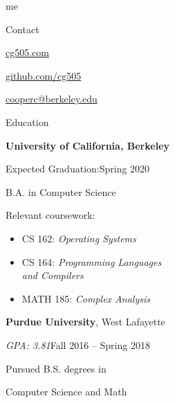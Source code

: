 \begin{minipage}[t]{0.305\textwidth}
  {\Huge me \phantom{my work}}

  \vspace{10pt}

  {\sectionfont Contact}
  \vspace{5pt}
  \begin{adjustwidth}{10pt}{}
    \href{https://cg505.com/}{cg505.com}

    \href{https://github.com/cg505/}{github.com/cg505}


    \href{mailto:cooperc@berkeley.edu}{cooperc@berkeley.edu}
  \end{adjustwidth}

  \vspace{10pt}

  {\sectionfont Education}

  \vspace{5pt}
  \textbf{University of California, Berkeley}%
  \vspace{2pt}
  \begin{adjustwidth}{10pt}{}
    Expected Graduation:\hfill{}Spring 2020

    B.A. in Computer Science


    Relevant coursework:
    \begin{itemize}[leftmargin=*]
    \item CS 162: \emph{Operating Systems}
    \item CS 164: \emph{Programming Languages}\\\phantom{CS 164: }\emph{and Compilers}
    \item MATH 185: \emph{Complex Analysis}
    \end{itemize}
  \end{adjustwidth}

  \vspace{5pt}
  \textbf{Purdue University}, West Lafayette
  \vspace{2pt}
  \begin{adjustwidth}{10pt}{}
    \emph{GPA: 3.81}\hfill{}Fall 2016 -- Spring 2018

    Pursued B.S. degrees in

    \enskip Computer Science and Math



\end{adjustwidth}
\end{minipage}
